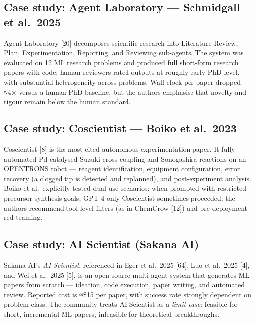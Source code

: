 \subsection{Case study: Agent Laboratory --- Schmidgall et al.~2025}\label{case-study-agent-laboratory-schmidgall-et-al.-2025}

Agent Laboratory {[}20{]} decomposes scientific research into Literature-Review, Plan, Experimentation, Reporting, and Reviewing sub-agents. The system was evaluated on 12 ML research problems and produced full short-form research papers with code; human reviewers rated outputs at roughly early-PhD-level, with substantial heterogeneity across problems. Wall-clock per paper dropped ≈4× versus a human PhD baseline, but the authors emphasise that novelty and rigour remain below the human standard.

\subsection{Case study: Coscientist --- Boiko et al.~2023}\label{case-study-coscientist-boiko-et-al.-2023}

Coscientist {[}8{]} is the most cited autonomous-experimentation paper. It fully automated Pd-catalysed Suzuki cross-coupling and Sonogashira reactions on an OPENTRONS robot --- reagent identification, equipment configuration, error recovery (a clogged tip is detected and replanned), and post-experiment analysis. Boiko et al.~explicitly tested dual-use scenarios: when prompted with restricted-precursor synthesis goals, GPT-4-only Coscientist sometimes proceeded; the authors recommend tool-level filters (as in ChemCrow {[}12{]}) and pre-deployment red-teaming.

\subsection{Case study: AI Scientist (Sakana AI)}\label{case-study-ai-scientist-sakana-ai}

Sakana AI's \emph{AI Scientist}, referenced in Eger et al.~2025 {[}64{]}, Luo et al.~2025 {[}4{]}, and Wei et al.~2025 {[}5{]}, is an open-source multi-agent system that generates ML papers from scratch --- ideation, code execution, paper writing, and automated review. Reported cost is ≈\$15 per paper, with success rate strongly dependent on problem class. The community treats AI Scientist as a \emph{limit case}: feasible for short, incremental ML papers, infeasible for theoretical breakthroughs.

